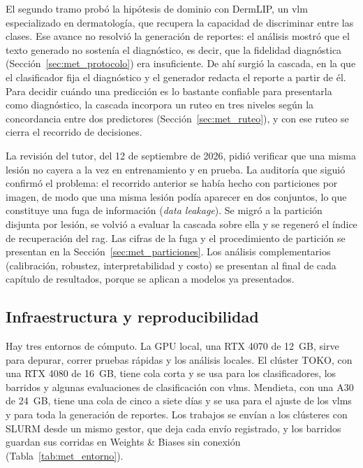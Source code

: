 El segundo tramo probó la hipótesis de dominio con DermLIP, un \gls{vlm} especializado en dermatología, que recupera la
capacidad de discriminar entre las clases. Ese avance no resolvió la generación de reportes: el análisis mostró que el
texto generado no sostenía el diagnóstico, es decir, que la fidelidad diagnóstica (Sección~\ref{sec:met_protocolo})
era insuficiente. De ahí surgió la cascada, en la que el clasificador fija el
diagnóstico y el generador redacta el reporte a partir de él. Para decidir cuándo una predicción es lo bastante
confiable para presentarla como diagnóstico, la cascada incorpora un ruteo en tres niveles según la concordancia entre dos predictores
(Sección~\ref{sec:met_ruteo}), y con ese ruteo se cierra el recorrido de decisiones.

La revisión del tutor, del 12 de septiembre de 2026, pidió verificar que una misma lesión no cayera a la vez en
entrenamiento y en prueba. La auditoría que siguió confirmó el problema: el recorrido anterior se había hecho con
particiones por imagen, de modo que una misma lesión podía aparecer en dos conjuntos, lo que constituye una fuga de
información (\emph{data leakage}). Se migró a la partición disjunta por lesión, se volvió a evaluar la cascada sobre ella y se
regeneró el índice de recuperación del \gls{rag}. Las cifras de la fuga y el procedimiento de partición se presentan en la
Sección~\ref{sec:met_particiones}. Los análisis complementarios (calibración, robustez, interpretabilidad y costo) se
presentan al final de cada capítulo de resultados, porque se aplican a modelos ya presentados.

\subsection{Infraestructura y reproducibilidad}
\label{sec:met_infra}

Hay tres entornos de cómputo. La GPU local, una RTX 4070 de 12~GB, sirve para depurar, correr pruebas rápidas y los
análisis locales. El clúster TOKO, con una RTX 4080 de 16~GB, tiene cola corta y se usa para los clasificadores, los
barridos y algunas evaluaciones de clasificación con \glspl{vlm}. Mendieta, con una A30 de 24~GB, tiene una cola de
cinco a siete días y se usa para el ajuste de los \glspl{vlm} y para toda la generación de reportes.
Los trabajos se envían a los clústeres con SLURM desde un mismo gestor, que deja cada envío registrado, y los barridos
guardan sus corridas en Weights \& Biases sin conexión (Tabla~\ref{tab:met_entorno}).

